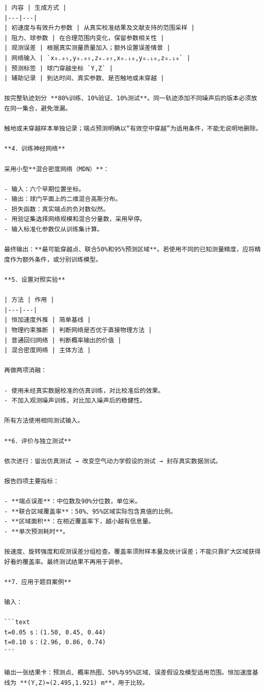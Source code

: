 \documentclass[UTF8,10pt]{ctexart}
\begin{document}
\begin{Verbatim}[breaklines=true,breakanywhere=true,fontsize=\scriptsize,frame=single,framesep=2pt]
| 内容 | 生成方式 |
|---|---|
| 初速度与有效升力参数 | 从真实校准结果及文献支持的范围采样 |
| 阻力、球参数 | 在合理范围内变化，保留参数相关性 |
| 观测误差 | 根据真实测量质量加入；额外设置误差情景 |
| 网络输入 | `x₀.₀₅,y₀.₀₅,z₀.₀₅,x₀.₁₀,y₀.₁₀,z₀.₁₀` |
| 预测标签 | 球门穿越坐标 `Y,Z` |
| 辅助记录 | 到达时间、真实参数、是否触地或未穿越 |

按完整轨迹划分 **80%训练、10%验证、10%测试**。同一轨迹添加不同噪声后的版本必须放在同一集合，避免泄漏。

触地或未穿越样本单独记录；端点预测明确以“有效空中穿越”为适用条件，不能无说明地删除。

**4．训练神经网络**

采用小型**混合密度网络（MDN）**：

- 输入：六个早期位置坐标。
- 输出：球门平面上的二维混合高斯分布。
- 损失函数：真实端点的负对数似然。
- 用验证集选择网络规模和混合分量数，采用早停。
- 输入标准化参数仅从训练集计算。

最终输出：**最可能穿越点、联合50%和95%预测区域**。若使用不同的已知测量精度，应将精度作为额外条件，或分别训练模型。

**5．设置对照实验**

| 方法 | 作用 |
|---|---|
| 恒加速度外推 | 简单基线 |
| 物理约束推断 | 判断网络是否优于直接物理方法 |
| 普通回归网络 | 判断概率输出的价值 |
| 混合密度网络 | 主体方法 |

再做两项消融：

- 使用未经真实数据校准的仿真训练，对比校准后的效果。
- 不加入观测噪声训练，对比加入噪声后的稳健性。

所有方法使用相同测试输入。

**6．评价与独立测试**

依次进行：留出仿真测试 → 改变空气动力学假设的测试 → 封存真实数据测试。

报告四项主要指标：

- **端点误差**：中位数及90%分位数，单位米。
- **联合区域覆盖率**：50%、95%区域实际包含真值的比例。
- **区域面积**：在相近覆盖率下，越小越有信息量。
- **单次预测耗时**。

按速度、旋转强度和观测误差分组检查。覆盖率须附样本量及统计误差；不能只靠扩大区域获得好看的覆盖率。最终测试结果不再用于调参。

**7．应用于题目案例**

输入：

```text
t=0.05 s：(1.50, 0.45, 0.44)
t=0.10 s：(2.96, 0.86, 0.74)
```

输出一张结果卡：预测点、概率热图、50%与95%区域、误差假设及模型适用范围。恒加速度基线为 **(Y,Z)≈(2.495,1.921) m**，用于比较。


\end{Verbatim}
\end{document}
